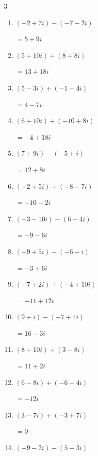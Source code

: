 \begin{multicols}{3}
\begin{enumerate}
        $\displaystyle =8-i$

  \item $\displaystyle (-2+7i) - (-7-2i)$

        $\displaystyle =5+9i$

  \item $\displaystyle (5+10i) + (8+8i)$

        $\displaystyle =13+18i$

  \item $\displaystyle (5-3i) + (-1-4i)$

        $\displaystyle =4-7i$

  \item $\displaystyle (6+10i) + (-10+8i)$

        $\displaystyle =-4+18i$

  \item $\displaystyle (7+9i) - (-5+i)$

        $\displaystyle =12+8i$

  \item $\displaystyle (-2+5i) + (-8-7i)$

        $\displaystyle =-10-2i$

  \item $\displaystyle (-3-10i) - (6-4i)$

        $\displaystyle =-9-6i$

  \item $\displaystyle (-9+5i) - (-6-i)$

        $\displaystyle =-3+6i$

  \item $\displaystyle (-7+2i) + (-4+10i)$

        $\displaystyle =-11+12i$

  \item $\displaystyle (9+i) - (-7+4i)$

        $\displaystyle =16-3i$

  \item $\displaystyle (8+10i) + (3-8i)$

        $\displaystyle =11+2i$

  \item $\displaystyle (6-8i) + (-6-4i)$

        $\displaystyle =-12i$

  \item $\displaystyle (3-7i) + (-3+7i)$

        $\displaystyle =0$

  \item $\displaystyle (-9-2i) - (5-3i)$


\end{enumerate}
\end{multicols}
